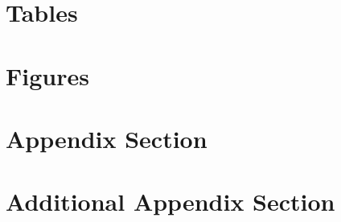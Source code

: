 \documentclass[12pt]{article}
\begin{document}
\section{Tables}


\iffalse
\begin{subtables}


\end{subtables}

\begin{subtables}


\end{subtables}
\fi

\section{Figures}





\clearpage
\appendix 
{}
\section{Appendix Section}\label{sec:appendixsection}

\section{Additional Appendix Section}\label{sec:additionalappendixsection}
\end{document}
